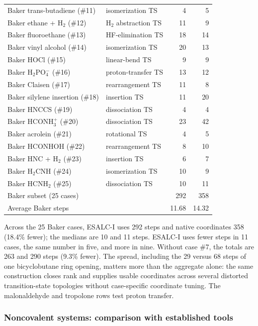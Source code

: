\documentclass[journal=jctcce,manuscript=article,layout=traditional]{achemso}
\theoremstyle{definition}
\begin{document}
\begin{table}[htbp]
\begin{tabularx}{\linewidth}{@{}lXrr@{}}
Baker trans-butadiene (\#11) & isomerization TS & 4 & 5 \\
Baker ethane + H$_2$ (\#12) & H$_2$ abstraction TS & 11 & 9 \\
Baker fluoroethane (\#13) & HF-elimination TS & 18 & 14 \\
Baker vinyl alcohol (\#14) & isomerization TS & 20 & 13 \\
Baker HOCl (\#15) & linear-bend TS & 9 & 9 \\
Baker H$_2$PO$_4^-$ (\#16) & proton-transfer TS & 13 & 12 \\
Baker Claisen (\#17) & rearrangement TS & 11 & 8 \\
Baker silylene insertion (\#18) & insertion TS & 11 & 20 \\
Baker HNCCS (\#19) & dissociation TS & 4 & 4 \\
Baker HCONH$_3^+$ (\#20) & dissociation TS & 23 & 42 \\
Baker acrolein (\#21) & rotational TS & 4 & 5 \\
Baker HCONHOH (\#22) & rearrangement TS & 8 & 10 \\
Baker HNC + H$_2$ (\#23) & insertion TS & 6 & 7 \\
Baker H$_2$CNH (\#24) & isomerization TS & 10 & 9 \\
Baker HCNH$_2$ (\#25) & dissociation TS & 10 & 11 \\
\midrule
Baker subset (25 cases) & & 292 & 358 \\
Average Baker steps & & 11.68 & 14.32 \\
\bottomrule
\end{tabularx}
\end{table}

{Across the 25 Baker cases, ESALC-I uses 292 steps and native
coordinates 358 (18.4\% fewer); the medians are 10 and 11 steps.
ESALC-I uses fewer steps in 11 cases, the same number in five, and more in nine.
Without case \#7, the totals are 263 and 290 steps (9.3\% fewer).  The spread, including the 29 versus 68 steps of one
bicyclobutane ring opening, matters more than the aggregate alone: the same
construction closes rank and supplies usable coordinates across several
distorted transition-state topologies without case-specific coordinate
tuning.  The malonaldehyde and tropolone rows test proton transfer.}
\endgroup

\subsubsection{{Noncovalent systems: comparison with established tools}}
\label{sec:noncovalent-comparison}
\end{document}
